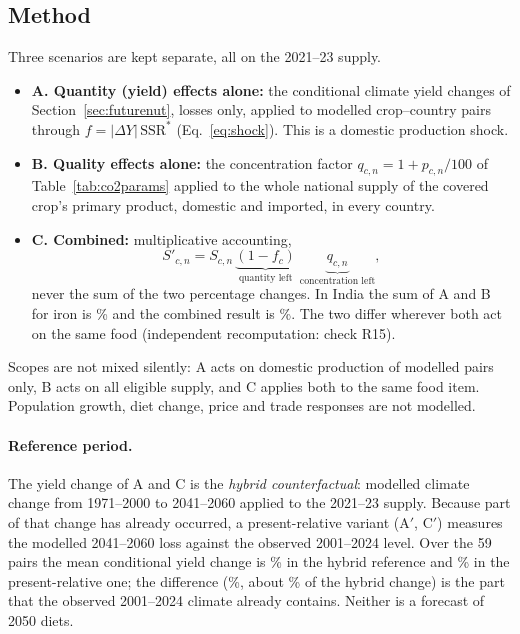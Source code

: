 \subsection{Method}\label{sec:co2method}
Three scenarios are kept separate, all on the 2021--23 supply.
\begin{itemize}
\item \textbf{A. Quantity (yield) effects alone:} the conditional climate yield changes of Section~\ref{sec:futurenut},
losses only, applied to modelled crop--country pairs through $f=|\Delta Y|\,\text{SSR}^{*}$ (Eq.~\ref{eq:shock}). This is
a domestic production shock.
\item \textbf{B. Quality effects alone:} the concentration factor $q_{c,n}=1+p_{c,n}/100$ of Table~\ref{tab:co2params}
applied to the whole national supply of the covered crop's primary product, domestic and imported, in every country.
\item \textbf{C. Combined:} multiplicative accounting,
\begin{equation}\label{eq:co2comb}
S'_{c,n}=S_{c,n}\,\underbrace{(1-f_c)}_{\text{quantity left}}\;\underbrace{q_{c,n}}_{\text{concentration left}},
\end{equation}
never the sum of the two percentage changes. In India the sum of A and B for iron is \cotwoIndAddIron\% and the
combined result is \cotwoIndCombIron\%. The two differ wherever both act on the same food (independent recomputation: check R15).
\end{itemize}
Scopes are not mixed silently: A acts on domestic production of modelled pairs only, B acts on all eligible supply, and
C applies both to the same food item. Population growth, diet change, price and trade responses are not modelled.

\paragraph{Reference period.} The yield change of A and C is the \emph{hybrid counterfactual}: modelled climate change
from 1971--2000 to 2041--2060 applied to the 2021--23 supply. Because part of that change has already occurred, a
present-relative variant (A$'$, C$'$) measures the modelled 2041--2060 loss against the observed 2001--2024 level. Over
the 59 pairs the mean conditional yield change is \% in the hybrid reference and \% in the
present-relative one; the difference (\%, about \% of the hybrid change) is the part
that the observed 2001--2024 climate already contains. Neither is a forecast of 2050 diets.

